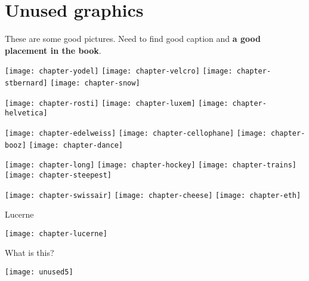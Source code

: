 \section{Unused graphics}

These are some good pictures. Need to find good caption and \textbf{a good placement in the book}.

\texttt{[image: chapter-yodel]}
\texttt{[image: chapter-velcro]}
\texttt{[image: chapter-stbernard]}
\texttt{[image: chapter-snow]}

\texttt{[image: chapter-rosti]}
\texttt{[image: chapter-luxem]}
\texttt{[image: chapter-helvetica]}

\texttt{[image: chapter-edelweiss]}
\texttt{[image: chapter-cellophane]}
\texttt{[image: chapter-booz]}
\texttt{[image: chapter-dance]}

\texttt{[image: chapter-long]}
\texttt{[image: chapter-hockey]}
\texttt{[image: chapter-trains]}
\texttt{[image: chapter-steepest]}

\texttt{[image: chapter-swissair]}
\texttt{[image: chapter-cheese]}
\texttt{[image: chapter-eth]}

Lucerne

\texttt{[image: chapter-lucerne]}

What is this?

\texttt{[image: unused5]}

